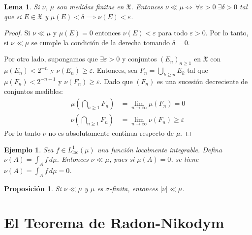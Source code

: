 \documentclass[12pt,a4paper]{article}
\theoremstyle{profesional}
\newtheorem{lemma}[teorema]{Lema}
\newtheorem{proposicion}[teorema]{Proposición}
\theoremstyle{definicion-style}
\newtheorem{ejemplo}[teorema]{Ejemplo}
\newcommand{\X}{\mathfrak{X}}
\begin{document}
\begin{lemma}
    Si \( \nu \), \( \mu \) son medidas finitas en \( \X \). Entonces \( \nu \ll \mu \iff \, \forall \varepsilon > 0 \; \exists \delta > 0 \) tal que si \( E \in \X \) y \( \mu(E) < \delta \implies \nu(E) < \varepsilon \).
\end{lemma}
\begin{proof}
    Si \( \nu \ll \mu \) y \( \mu(E) = 0 \) entonces \( \nu(E) < \varepsilon \) para todo \( \varepsilon > 0 \). Por lo tanto, si \( \nu \ll \mu \) se cumple la condición de la derecha tomando \( \delta = 0 \).

    Por otro lado, supongamos que \( \exists \varepsilon > 0 \) y conjuntos \( {(E_n)}_{n \geq 1} \) en \( \X \) con \( \mu(E_n) < 2^{-n} \) y \( \nu(E_n) \geq \varepsilon \).
    Entonces, sea \( F_n = \bigcup_{k \geq n} E_k \) tal que \( \mu(F_n) < 2^{-n+1} \) y \( \nu(F_n) \geq \varepsilon \). Dado que \( (F_n) \) es una sucesión decreciente de conjuntos medibles:\begin{align*}
        \mu\left( \bigcap_{n \geq 1} F_n \right) & = \lim_{n \to \infty} \mu(F_n) = 0              \\
        \nu\left( \bigcap_{n \geq 1} F_n \right) & = \lim_{n \to \infty} \nu(F_n) \geq \varepsilon
    \end{align*}
    Por lo tanto \( \nu \) no es absolutamente continua respecto de \( \mu \).
\end{proof}

\begin{ejemplo}
    Sea \(f \in L^1_{\text{loc}}(\mu)\) una función localmente integrable. Defina \(\nu(A) = \int_A f \, d\mu \). Entonces \(\nu \ll \mu \), pues si \(\mu(A) = 0\), se tiene \(\nu(A) = \int_A f \, d\mu = 0\).
\end{ejemplo}

\begin{proposicion}
    Si \(\nu \ll \mu \) y \(\mu \) es \(\sigma \)-finita, entonces \(|\nu| \ll \mu \).
\end{proposicion}

\section{El Teorema de Radon-Nikodym}
\end{document}
